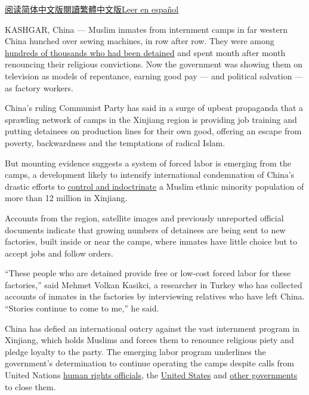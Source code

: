\href{https://cn.nytimes3xbfgragh.onion/china/20181217/xinjiang-china-forced-labor-camps-uighurs/}{阅读简体中文版}\href{https://cn.nytimes3xbfgragh.onion/china/20181217/xinjiang-china-forced-labor-camps-uighurs/zh-hant/}{閱讀繁體中文版}\href{https://www.nytimes3xbfgragh.onion/es/2018/12/18/campos-trabajo-musulmanes-china}{Leer
en español}

KASHGAR, China --- Muslim inmates from internment camps in far western
China hunched over sewing machines, in row after row. They were among
\href{https://www.nytimes3xbfgragh.onion/2018/09/08/world/asia/china-uighur-muslim-detention-camp.html}{hundreds
of thousands who had been detained} and spent month after month
renouncing their religious convictions. Now the government was showing
them on television as models of repentance, earning good pay --- and
political salvation --- as factory workers.

China's ruling Communist Party has said in a surge of upbeat propaganda
that a sprawling network of camps in the Xinjiang region is providing
job training and putting detainees on production lines for their own
good, offering an escape from poverty, backwardness and the temptations
of radical Islam.

But mounting evidence suggests a system of forced labor is emerging from
the camps, a development likely to intensify international condemnation
of China's drastic efforts to
\href{https://www.nytimes3xbfgragh.onion/2018/09/08/world/asia/china-uighur-muslim-detention-camp.html}{control
and indoctrinate} a Muslim ethnic minority population of more than 12
million in Xinjiang.

Accounts from the region, satellite images and previously unreported
official documents indicate that growing numbers of detainees are being
sent to new factories, built inside or near the camps, where inmates
have little choice but to accept jobs and follow orders.

``These people who are detained provide free or low-cost forced labor
for these factories,'' said Mehmet Volkan Kasikci, a researcher in
Turkey who has collected accounts of inmates in the factories by
interviewing relatives who have left China. ``Stories continue to come
to me,'' he said.

China has defied an international outcry against the vast internment
program in Xinjiang, which holds Muslims and forces them to renounce
religious piety and pledge loyalty to the party. The emerging labor
program underlines the government's determination to continue operating
the camps despite calls from United Nations
\href{https://www.nytimes3xbfgragh.onion/2018/11/13/world/asia/un-china-xinjiang-muslim-internments.html}{human
rights officials}, the
\href{https://www.nytimes3xbfgragh.onion/2018/09/10/world/asia/us-china-sanctions-muslim-camps.html}{United
States} and
\href{https://www.nytimes3xbfgragh.onion/2018/11/06/world/asia/china-detention-uighur-muslims.html}{other
governments} to close them.

